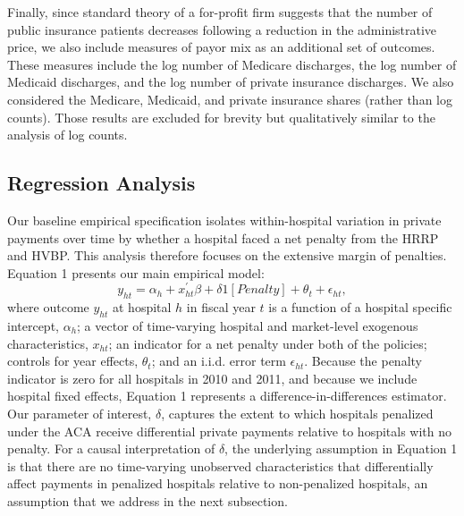 \documentclass[12pt]{article}
\begin{document}
Finally, since standard theory of a for-profit firm suggests that the number of public insurance patients decreases following a reduction in the administrative price, we also include measures of payor mix as an additional set of outcomes. These measures include the log number of Medicare discharges, the log number of Medicaid discharges, and the log number of private insurance discharges. We also considered the Medicare, Medicaid, and private insurance shares (rather than log counts). Those results are excluded for brevity but qualitatively similar to the analysis of log counts.

\subsection{Regression Analysis}
Our baseline empirical specification isolates within-hospital variation in private payments over time by whether a hospital faced a net penalty from the HRRP and HVBP. This analysis therefore focuses on the extensive margin of penalties.  Equation 1 presents our main empirical model:
\begin{equation}
\label{eq: reg}
y_{ht} = \alpha_{h} + x^{'}_{ht}\beta + \delta1[Penalty]  + \theta_{t}  +  \epsilon_{ht},
\end{equation}
where outcome $y_{ht}$ at hospital $h$ in fiscal year $t$ is a function of a hospital specific intercept, $\alpha_{h}$; a vector of time-varying hospital and market-level exogenous characteristics, $x_{ht}$; an indicator for a net penalty under both of the policies; controls for year effects, $\theta_t$; and an i.i.d. error term $\epsilon_{ht}$.  Because the penalty indicator is zero for all hospitals in 2010 and 2011, and because we include hospital fixed effects, Equation 1 represents a difference-in-differences estimator. Our parameter of interest, $\delta$, captures the extent to which hospitals penalized under the ACA receive differential private payments relative to hospitals with no penalty.  For a causal interpretation of $\delta$, the underlying assumption in Equation 1 is that there are no time-varying unobserved characteristics that differentially affect payments in penalized hospitals relative to non-penalized hospitals, an assumption that we address in the next subsection.
\end{document}
